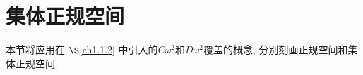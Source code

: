 \documentclass[main.tex]{subfiles}
\begin{document}
	
\section{集体正规空间}\label{ch3.2}
本节将应用在 $\S$\ref{ch1.1.2} 中引入的$C\omega^2$和$D\omega^2$覆盖的概念,
分别刻画正规空间和集体正规空间.
	
\end{document}
